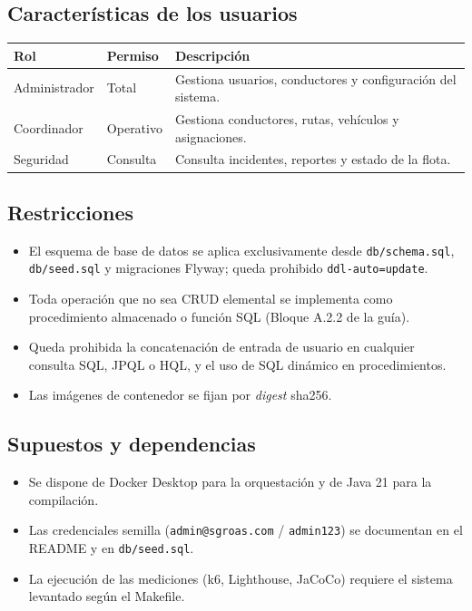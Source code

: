 \documentclass[12pt,a4paper]{article}
\begin{document}
\subsection{Características de los usuarios}
\label{sec:usuarios}

\begin{longtable}{@{}p{3cm}p{3.5cm}p{8cm}@{}}
\toprule
\textbf{Rol} & \textbf{Permiso} & \textbf{Descripción} \\
\midrule
\endhead
Administrador & Total & Gestiona usuarios, conductores y configuración del sistema. \\
Coordinador & Operativo & Gestiona conductores, rutas, vehículos y asignaciones. \\
Seguridad & Consulta & Consulta incidentes, reportes y estado de la flota. \\
\bottomrule
\end{longtable}

\subsection{Restricciones}
\label{sec:restricciones}

\begin{itemize}
  \item El esquema de base de datos se aplica exclusivamente desde \texttt{db/schema.sql},
  \texttt{db/seed.sql} y migraciones Flyway; queda prohibido \texttt{ddl-auto=update}.
  \item Toda operación que no sea CRUD elemental se implementa como procedimiento almacenado
  o función SQL (Bloque A.2.2 de la guía).
  \item Queda prohibida la concatenación de entrada de usuario en cualquier consulta SQL, JPQL
  o HQL, y el uso de SQL dinámico en procedimientos.
  \item Las imágenes de contenedor se fijan por \textit{digest} sha256.
\end{itemize}

\subsection{Supuestos y dependencias}
\label{sec:supuestos}

\begin{itemize}
  \item Se dispone de Docker Desktop para la orquestación y de Java 21 para la compilación.
  \item Las credenciales semilla (\texttt{admin@sgroas.com} / \texttt{admin123}) se documentan
  en el README y en \texttt{db/seed.sql}.
  \item La ejecución de las mediciones (k6, Lighthouse, JaCoCo) requiere el sistema levantado
  según el Makefile.
\end{itemize}
\end{document}
